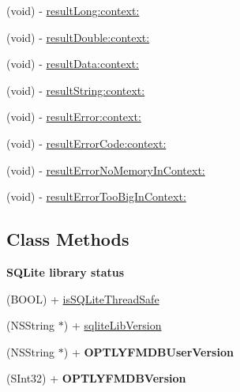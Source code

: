 \begin{Indent}
\begin{DoxyCompactItemize}
(void) -\/ \mbox{\hyperlink{interface_o_p_t_l_y_f_m_d_b_database_ac26186953f5c9ce369dce9dd94356be2}{result\+Long\+:context\+:}}
\item 
(void) -\/ \mbox{\hyperlink{interface_o_p_t_l_y_f_m_d_b_database_ac039575b6d5bc656bb54eeb6f88d71e6}{result\+Double\+:context\+:}}
\item 
(void) -\/ \mbox{\hyperlink{interface_o_p_t_l_y_f_m_d_b_database_abd92d5bcab93f267421e36f920c2a474}{result\+Data\+:context\+:}}
\item 
(void) -\/ \mbox{\hyperlink{interface_o_p_t_l_y_f_m_d_b_database_ac7c27744e97581b6cc0f50ba72c5874c}{result\+String\+:context\+:}}
\item 
(void) -\/ \mbox{\hyperlink{interface_o_p_t_l_y_f_m_d_b_database_aef8ca2bd4709a1411f10757daec353cf}{result\+Error\+:context\+:}}
\item 
(void) -\/ \mbox{\hyperlink{interface_o_p_t_l_y_f_m_d_b_database_a08861b58136840fe405473721abcd26f}{result\+Error\+Code\+:context\+:}}
\item 
(void) -\/ \mbox{\hyperlink{interface_o_p_t_l_y_f_m_d_b_database_a664d742e398dd193a735e287b8a32435}{result\+Error\+No\+Memory\+In\+Context\+:}}
\item 
(void) -\/ \mbox{\hyperlink{interface_o_p_t_l_y_f_m_d_b_database_ac51aeb563e8af7a9f9ee4dd562c083d8}{result\+Error\+Too\+Big\+In\+Context\+:}}
\end{DoxyCompactItemize}
\end{Indent}
\subsection*{Class Methods}
\begin{Indent}\textbf{ S\+Q\+Lite library status}\par
{\em 

 

 }\begin{DoxyCompactItemize}
\item 
(B\+O\+OL) + \mbox{\hyperlink{interface_o_p_t_l_y_f_m_d_b_database_a38f39fc14807b0903098b977d3a04649}{is\+S\+Q\+Lite\+Thread\+Safe}}
\item 
(N\+S\+String $\ast$) + \mbox{\hyperlink{interface_o_p_t_l_y_f_m_d_b_database_af059d6a70119fd76bf338759d92b4a46}{sqlite\+Lib\+Version}}
\item 
\mbox{\label{interface_o_p_t_l_y_f_m_d_b_database_a7cd3bea80e22d10767441e2dc94ed872}} 
(N\+S\+String $\ast$) + {\bfseries O\+P\+T\+L\+Y\+F\+M\+D\+B\+User\+Version}
\item 
\mbox{\label{interface_o_p_t_l_y_f_m_d_b_database_a029f167be1ae69696b87fc5775abd678}} 
(S\+Int32) + {\bfseries O\+P\+T\+L\+Y\+F\+M\+D\+B\+Version}
\end{DoxyCompactItemize}
\end{Indent}
